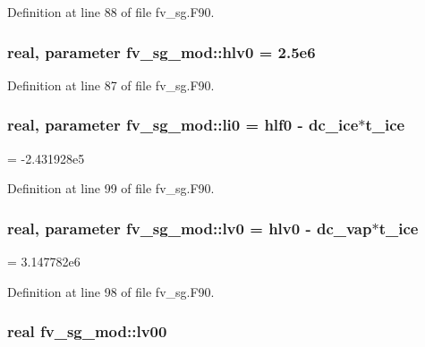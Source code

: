 Definition at line 88 of file fv\-\_\-sg.\-F90.

\subsubsection[{hlv0}]{\setlength{\rightskip}{0pt plus 5cm}real, parameter fv\-\_\-sg\-\_\-mod\-::hlv0 = 2.\-5e6\hspace{0.3cm}{\ttfamily [private]}}\label{classfv__sg__mod_a3b888bbbc28cceecf2d4157bc40f7e97}


Definition at line 87 of file fv\-\_\-sg.\-F90.

\subsubsection[{li0}]{\setlength{\rightskip}{0pt plus 5cm}real, parameter fv\-\_\-sg\-\_\-mod\-::li0 = {\bf hlf0} -\/ {\bf dc\-\_\-ice}$\ast${\bf t\-\_\-ice}\hspace{0.3cm}{\ttfamily [private]}}\label{classfv__sg__mod_a5c833712f86de131c6bdc48cac46909e}


= -\/2.\-431928e5 



Definition at line 99 of file fv\-\_\-sg.\-F90.

\subsubsection[{lv0}]{\setlength{\rightskip}{0pt plus 5cm}real, parameter fv\-\_\-sg\-\_\-mod\-::lv0 = {\bf hlv0} -\/ {\bf dc\-\_\-vap}$\ast${\bf t\-\_\-ice}\hspace{0.3cm}{\ttfamily [private]}}\label{classfv__sg__mod_a81ad127cb875ed67c0b2b72faddbd28b}


= 3.\-147782e6 



Definition at line 98 of file fv\-\_\-sg.\-F90.

\subsubsection[{lv00}]{\setlength{\rightskip}{0pt plus 5cm}real fv\-\_\-sg\-\_\-mod\-::lv00\hspace{0.3cm}{\ttfamily [private]}}\label{classfv__sg__mod_a853263bfe986528320e887a8a48f1978}


